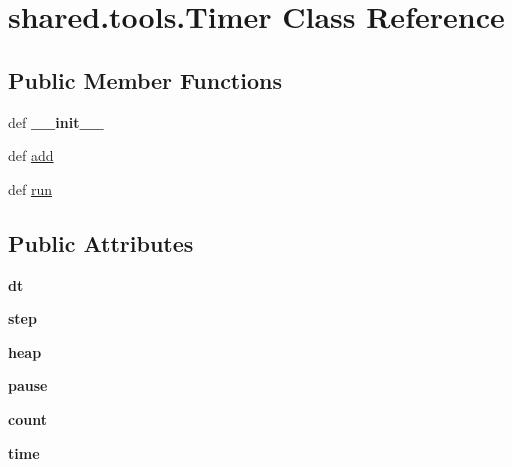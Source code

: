 \hypertarget{classshared_1_1tools_1_1_timer}{\section{shared.\-tools.\-Timer \-Class \-Reference}
\label{classshared_1_1tools_1_1_timer}
}
\subsection*{\-Public \-Member \-Functions}
\begin{DoxyCompactItemize}
\item 
\hypertarget{classshared_1_1tools_1_1_timer_ac9d53e627f1e0ebfaf929f275507af67}{def {\bfseries \-\_\-\-\_\-init\-\_\-\-\_\-}}\label{classshared_1_1tools_1_1_timer_ac9d53e627f1e0ebfaf929f275507af67}

\item 
def \hyperlink{classshared_1_1tools_1_1_timer_af001150c4311860c64e401c86bc59b4c}{add}
\item 
def \hyperlink{classshared_1_1tools_1_1_timer_ad56f872ef14a1fde4c004ee38ef38226}{run}
\end{DoxyCompactItemize}
\subsection*{\-Public \-Attributes}
\begin{DoxyCompactItemize}
\item 
\hypertarget{classshared_1_1tools_1_1_timer_a81f647de622c9fc1bce2c4f4c7c39681}{{\bfseries dt}}\label{classshared_1_1tools_1_1_timer_a81f647de622c9fc1bce2c4f4c7c39681}

\item 
\hypertarget{classshared_1_1tools_1_1_timer_af4f9536a522790450df92052d17dc0bb}{{\bfseries step}}\label{classshared_1_1tools_1_1_timer_af4f9536a522790450df92052d17dc0bb}

\item 
\hypertarget{classshared_1_1tools_1_1_timer_a0a7b10b880cace49c98949f009d85882}{{\bfseries heap}}\label{classshared_1_1tools_1_1_timer_a0a7b10b880cace49c98949f009d85882}

\item 
\hypertarget{classshared_1_1tools_1_1_timer_ad801e7fe8f900444e346582efea3a96e}{{\bfseries pause}}\label{classshared_1_1tools_1_1_timer_ad801e7fe8f900444e346582efea3a96e}

\item 
\hypertarget{classshared_1_1tools_1_1_timer_a0a8f64067ec8cf37a65385166ad8c7a6}{{\bfseries count}}\label{classshared_1_1tools_1_1_timer_a0a8f64067ec8cf37a65385166ad8c7a6}

\item 
\hypertarget{classshared_1_1tools_1_1_timer_ad2d1cfb98600c0e4bb86be4948756095}{{\bfseries time}}\label{classshared_1_1tools_1_1_timer_ad2d1cfb98600c0e4bb86be4948756095}

\end{DoxyCompactItemize}


